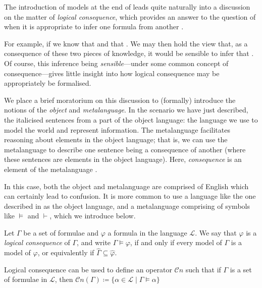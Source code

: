 The introduction of models at the end of  leads quite naturally into a discussion on the matter of \textit{logical consequence}, which provides an answer to the question of when it is appropriate to infer one formula from another  \cite[p. 408]{turquette1957logic}.  

For example, if we know that  and that . We may then hold the view that, as a consequence of these two pieces of knowledge, it would be sensible to infer that . Of course, this inference being \textit{sensible}---under some common concept of consequence---gives little insight into how logical consequence may be appropriately be formalised. 

 
We place a brief moratorium on this discussion to (formally) introduce the notions of the \textit{object} and \textit{metalanguage}. In the scenario we have just described, the italicised sentences from a part of the object language: the language we use to model the world and represent information. The metalanguage facilitates reasoning about elements in the object language; that is, we can use the metalanguage to describe one sentence being a consequence of another (where these sentences are elements in the object language). Here, \textit{consequence} is an element of the metalanguage \cite[p 22]{Ben1993Mathematical}.

In this case, both the object and metalanguage are comprised of English which can certainly lead to confusion. It is more common to use a language like the one described in  as the object language, and a metalanguage comprising of symbols like $\vDash$ and $\vdash$, which we introduce below. 

\begin{definition}
     \label{definition:logical-consequence}
     Let $\Gamma$ be a set of formulae and $\varphi$ a formula in the language $\mathcal{L}$. We say that $\varphi$ is a \textit{logical consequence} of $\Gamma$, and write $\Gamma \vDash \varphi$, if and only if every model of $\Gamma$ is a model of $\varphi$, or equivalently if $\hat{\Gamma} \subseteq \hat{\varphi}$.
\end{definition}

Logical consequence can be used to define an operator $\mathcal{C}n$ such that if $\Gamma$ is a set of formulae in $\mathcal{L}$, then $\mathcal{C}n(\Gamma) \coloneqq \{\alpha \in \mathcal{L} \mid \Gamma \vDash \alpha\}$

